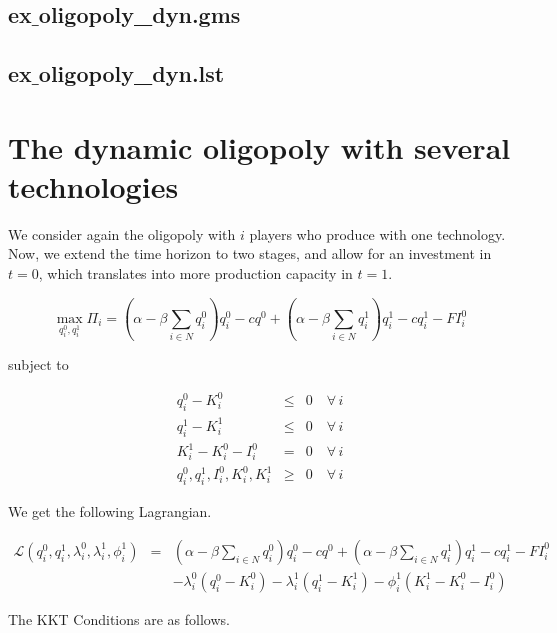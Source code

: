 \documentclass[11pt,a4paper]{article}
\begin{document}
\subsection*{ex$\_$oligopoly\_dyn.gms}



\subsection*{ex$\_$oligopoly\_dyn.lst}




\section{The dynamic oligopoly with several technologies}


We consider again the oligopoly with $i$ players who produce with one technology. Now, we extend the time horizon to two stages, and allow for an investment in $t=0$, which translates into more production capacity in $t=1$.

\begin{equation*}
	\max_{q_i^0,q_i^1}\Pi_i = (\alpha-\beta \sum_{i\in N}q_i^0)q_i^0 - cq^0 +  (\alpha-\beta \sum_{i\in N}q_i^1)q_i^1 - cq_i^1 -FI_i^0
\end{equation*}

subject to

\begin{eqnarray*}
	q_i^0 - K_i^0 &\leq& 0 \quad\forall\, i\\
	q_i^1 - K_i^1 &\leq& 0 \quad\forall\, i\\
        K_i^1 - K_i^0 - I_i^0 &=& 0 \quad\forall\, i\\
	q_i^0,q_i^1,I_i^0, K_i^0, K_i^1 &\geq& 0 \quad\forall\, i
\end{eqnarray*}
 
We get the following Lagrangian.

\begin{eqnarray*}
	\mathcal{L}(q_i^0,q_i^1,\lambda_i^0,\lambda_i^1,\phi_i^1)&=&  (\alpha-\beta \sum_{i\in N}q_i^0)q_i^0 - cq^0 +  (\alpha-\beta \sum_{i\in N}q_i^1)q_i^1 - cq_i^1 -FI_i^0\\
        && - \lambda_i^0(q_i^0-K_i^0) - \lambda_i^1(q_i^1-K_i^1) - \phi_i^1(K_i^1-K_i^0-I_i^0)
\end{eqnarray*}

The KKT Conditions are as follows.
\end{document}
